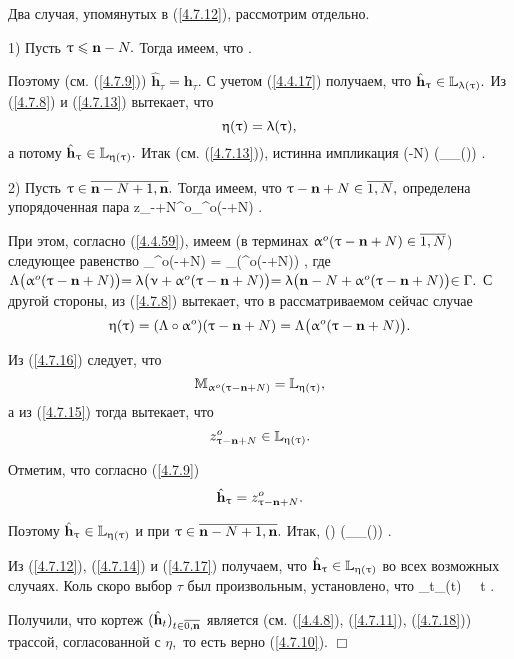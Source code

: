 Два случая, упомянутых в (\ref{4.7.12}),
рассмотрим отдельно.

1) Пусть
$\uptau\leqslant {\mathbf n}-N.$
Тогда имеем, что
\bfn
  \label{4.7.13}
  \tau\in {}
  .
\efn

Поэтому
(см. (\ref{4.7.9}))
$\hat{\mathbf{h}}_\tau = \mathbf{h}_\tau.$
С учетом
(\ref{4.4.17})
получаем, что
$\hat{\mathbf{h}}_\uptau\in {\mathbb L}_{\uplambda(\uptau)}.$
Из
(\ref{4.7.8}) и (\ref{4.7.13}) вытекает, что
$$
  \upeta(\uptau) = \uplambda(\uptau)
  ,
$$
а потому
$\hat{\mathbf{h}}_\uptau\in{\mathbb L}_{\upeta(\uptau)}.$
Итак (см. (\ref{4.7.13})),
истинна импликация
\bfn
  \label{4.7.14}
  (\tau\leqslant \nn-N) \Longrightarrow (_\tau\in \bbl_{\eta(\tau)})
  .
\efn

2) Пусть
$\tau\in\ov{\nn-N+1,\nn}.$
Тогда имеем, что
$\tau-\nn+N\in\ov{1,N},$
определена упорядоченная пара
\bfn
  \label{4.7.15}
  z_{\tau-\nn+N}^o\in\bbm_{\al^o(\tau-\nn+N)}
  .
\efn

При этом,
согласно (\ref{4.4.59}),
имеем
(в терминах $\al^o(\tau-\nn+N)\in\ov{1,N}$)
следующее равенство
\bfn
  \label{4.7.16}
  \bbm_{\al^o(\tau-\nn+N)} = \bbl_{\La(\al^o(\tau-\nn+N))}
  ,
\efn
где
$\Lambda\bigl(\upalpha^o(\uptau-{\mathbf n}+N)\bigl) = \uplambda\bigl(\upnu + \upalpha^o(\uptau-{\mathbf n}+N)\bigl) =
\uplambda\bigl({\mathbf n}-N +\upalpha^o(\uptau-{\mathbf n}+N)\bigl) \in \Gamma.$
С другой стороны, из (\ref{4.7.8})
вытекает, что в рассматриваемом сейчас случае
$$
  \upeta(\uptau) = (\Lambda\circ \upalpha^o)(\uptau-{\mathbf n}+N) = \Lambda\bigl(\upalpha^o(\uptau-{\mathbf n}+N)\bigl)
  .
$$

Из (\ref{4.7.16}) следует, что
$$
  {\mathbb M}_{\upalpha^o(\uptau-{\mathbf n}+N)} = {\mathbb L}_{\upeta(\uptau)}
  ,
$$
а из (\ref{4.7.15})
тогда вытекает, что
$$
  z^o_{\uptau-{\mathbf n}+N} \in {\mathbb L}_{\upeta(\uptau)}
  .
$$

Отметим, что согласно (\ref{4.7.9})
$$
  \hat{\mathbf{h}}_\uptau = z^o_{\uptau-{\mathbf n}+N}
  .
$$

Поэтому
$\hat{\mathbf{h}}_\uptau \in{\mathbb L}_{\upeta(\uptau)}$ и при $\tau\in \ov{\nn-N+1,\nn}.$
Итак,
\bfn
  \label{4.7.17}
  (\tau\in{}) \Longrightarrow (_\tau\in \bbl_{\eta(\tau)})
  .
\efn

Из (\ref{4.7.12}), (\ref{4.7.14}) и (\ref{4.7.17})
получаем, что
$\hat{\mathbf{h}}_\uptau\in {\mathbb L}_{\upeta(\uptau)}$
во всех возможных случаях.
Коль скоро выбор $\tau$ был произвольным, установлено, что
\bfn
  \label{4.7.18}
  _t\in \bbl_{\eta(t)} \ \ \fa t\in {}
  .
\efn

Получили, что кортеж
$(\hat{\mathbf{h}}_t)_{t\in\ov{0,\nn}}$
является
(см. (\ref{4.4.8}), (\ref{4.7.11}), (\ref{4.7.18}))
трассой, согласованной с $\eta,$ то есть
верно (\ref{4.7.10}).
\hfill$\Box$

